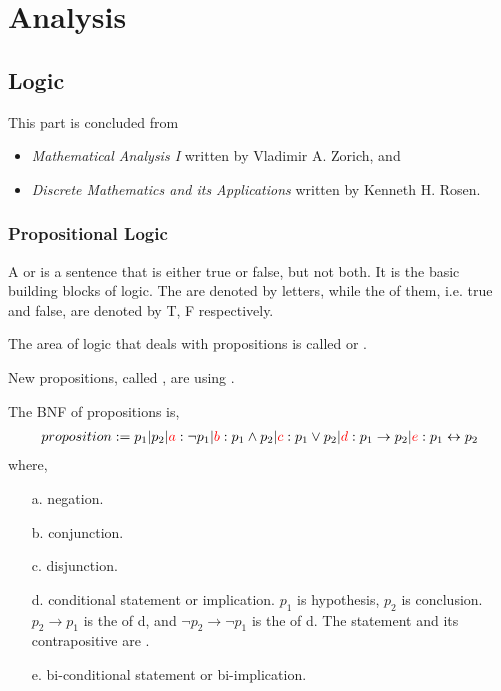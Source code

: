 \section{Analysis}

\subsection{Logic}

This part is concluded from 
\begin{itemize}
  \item \emph{Mathematical Analysis I} written by Vladimir A. Zorich, and
  \item \emph{Discrete Mathematics and its Applications} written by Kenneth H. Rosen.
\end{itemize}

\crule

\subsubsection{Propositional Logic}

A  or  is a  
sentence that is either true or false, but not both.
It is the basic building blocks of logic.
The  are denoted by letters,
while the  of them, 
i.e. true and false, are denoted by T, F respectively.

The area of logic that deals with propositions is called 
 or .

New propositions, called , are 
using 
.

The BNF of propositions is, 
\begin{align*}
  proposition := p_1 | p_2 | 
    {\color{red}a}: \neg{p_1} | 
    {\color{red}b}: p_1 \wedge p_2 | 
    {\color{red}c}: p_1 \vee p_2 | 
    {\color{red}d}: p_1 \rightarrow p_2 | 
    {\color{red}e}: p_1 \leftrightarrow p_2
\end{align*}
where, 
\begin{itemize}
  \item[a.] negation.
  \item[b.] conjunction.
  \item[c.] disjunction.
  \item[d.] conditional statement or implication.
    $p_1$ is hypothesis, $p_2$ is conclusion.
    $p_2 \rightarrow p_1$ is the  of d,
    and $\neg{p_2} \rightarrow \neg{p_1}$ is the  of d.
    The statement and its contrapositive are .
  \item[e.] bi-conditional statement or bi-implication.
\end{itemize}

